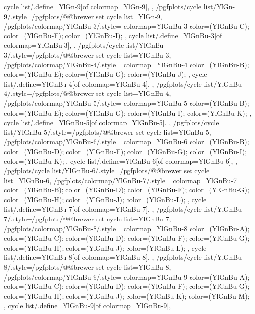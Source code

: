 {{    cycle list/.define={YlGn-9}{[of colormap=YlGn-9]},
  },
  /pgfplots/cycle list/YlGn-9/.style={/pgfplots/@@brewer set cycle list={YlGn-9}},
  /pgfplots/colormap/YlGnBu-3/.style={
    colormap={YlGnBu-3}{
      color=(YlGnBu-C);
      color=(YlGnBu-F);
      color=(YlGnBu-I);
    },
    cycle list/.define={YlGnBu-3}{[of colormap=YlGnBu-3]},
  },
  /pgfplots/cycle list/YlGnBu-3/.style={/pgfplots/@@brewer set cycle list={YlGnBu-3}},
  /pgfplots/colormap/YlGnBu-4/.style={
    colormap={YlGnBu-4}{
      color=(YlGnBu-B);
      color=(YlGnBu-E);
      color=(YlGnBu-G);
      color=(YlGnBu-J);
    },
    cycle list/.define={YlGnBu-4}{[of colormap=YlGnBu-4]},
  },
  /pgfplots/cycle list/YlGnBu-4/.style={/pgfplots/@@brewer set cycle list={YlGnBu-4}},
  /pgfplots/colormap/YlGnBu-5/.style={
    colormap={YlGnBu-5}{
      color=(YlGnBu-B);
      color=(YlGnBu-E);
      color=(YlGnBu-G);
      color=(YlGnBu-I);
      color=(YlGnBu-K);
    },
    cycle list/.define={YlGnBu-5}{[of colormap=YlGnBu-5]},
  },
  /pgfplots/cycle list/YlGnBu-5/.style={/pgfplots/@@brewer set cycle list={YlGnBu-5}},
  /pgfplots/colormap/YlGnBu-6/.style={
    colormap={YlGnBu-6}{
      color=(YlGnBu-B);
      color=(YlGnBu-D);
      color=(YlGnBu-F);
      color=(YlGnBu-G);
      color=(YlGnBu-I);
      color=(YlGnBu-K);
    },
    cycle list/.define={YlGnBu-6}{[of colormap=YlGnBu-6]},
  },
  /pgfplots/cycle list/YlGnBu-6/.style={/pgfplots/@@brewer set cycle list={YlGnBu-6}},
  /pgfplots/colormap/YlGnBu-7/.style={
    colormap={YlGnBu-7}{
      color=(YlGnBu-B);
      color=(YlGnBu-D);
      color=(YlGnBu-F);
      color=(YlGnBu-G);
      color=(YlGnBu-H);
      color=(YlGnBu-J);
      color=(YlGnBu-L);
    },
    cycle list/.define={YlGnBu-7}{[of colormap=YlGnBu-7]},
  },
  /pgfplots/cycle list/YlGnBu-7/.style={/pgfplots/@@brewer set cycle list={YlGnBu-7}},
  /pgfplots/colormap/YlGnBu-8/.style={
    colormap={YlGnBu-8}{
      color=(YlGnBu-A);
      color=(YlGnBu-C);
      color=(YlGnBu-D);
      color=(YlGnBu-F);
      color=(YlGnBu-G);
      color=(YlGnBu-H);
      color=(YlGnBu-J);
      color=(YlGnBu-L);
    },
    cycle list/.define={YlGnBu-8}{[of colormap=YlGnBu-8]},
  },
  /pgfplots/cycle list/YlGnBu-8/.style={/pgfplots/@@brewer set cycle list={YlGnBu-8}},
  /pgfplots/colormap/YlGnBu-9/.style={
    colormap={YlGnBu-9}{
      color=(YlGnBu-A);
      color=(YlGnBu-C);
      color=(YlGnBu-D);
      color=(YlGnBu-F);
      color=(YlGnBu-G);
      color=(YlGnBu-H);
      color=(YlGnBu-J);
      color=(YlGnBu-K);
      color=(YlGnBu-M);
    },
    cycle list/.define={YlGnBu-9}{[of colormap=YlGnBu-9]},
}}

